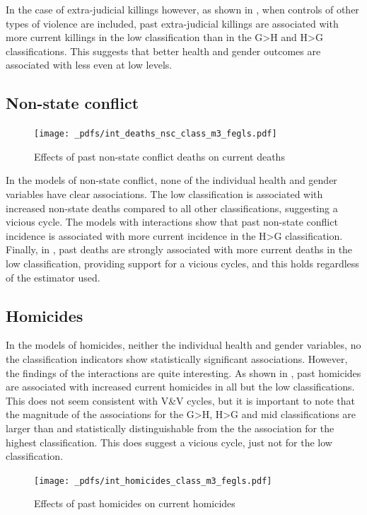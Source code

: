 \documentclass[12pt]{article}
\begin{document}
In the case of extra-judicial killings however, as shown in , when controls of other types of violence are included, past extra-judicial killings are associated with more current killings in the low classification than in the G>H and H>G classifications. This suggests that better health and gender outcomes are associated with less even at low levels.

\subsection{Non-state conflict}

\begin{figure}[!htb]
    \centering
    \caption{Effects of past non-state conflict deaths on current deaths}
    \label{int_deaths_nsc}
    \texttt{[image: \_pdfs/int\_deaths\_nsc\_class\_m3\_fegls.pdf]}
\end{figure}

In the models of non-state conflict, none of the individual health and gender variables have clear associations. The low classification is associated with increased non-state deaths compared to all other classifications, suggesting a vicious cycle. The models with interactions show that past non-state conflict incidence is associated with more current incidence in the H>G classification. Finally, in , past deaths are strongly associated with more current deaths in the low classification, providing support for a vicious cycles, and this holds regardless of the estimator used.

\subsection{Homicides}

In the models of homicides, neither the individual health and gender variables, no the classification indicators show statistically significant associations. However, the findings of the interactions are quite interesting. As shown in , past homicides are associated with increased current homicides in all but the low classifications. This does not seem consistent with V\&V cycles, but it is important to note that the magnitude of the associations for the G>H, H>G and mid classifications are larger than and statistically distinguishable from the the association for the highest classification. This does suggest a vicious cycle, just not for the low classification.

\begin{figure}[!htb]
    \centering
    \caption{Effects of past homicides on current homicides}
    \label{int_homicides}
    \texttt{[image: \_pdfs/int\_homicides\_class\_m3\_fegls.pdf]}
\end{figure}
\end{document}
